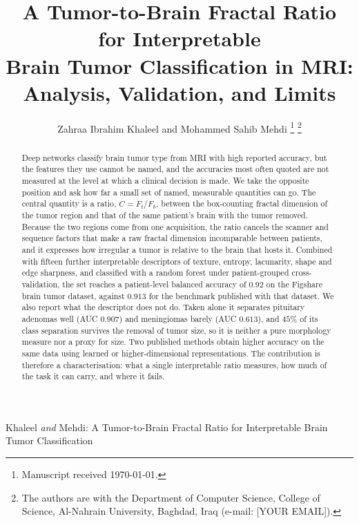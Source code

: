 \documentclass[journal]{IEEEtran}
\begin{document}
\title{A Tumor-to-Brain Fractal Ratio for Interpretable\\
Brain Tumor Classification in MRI:\\
Analysis, Validation, and Limits}

\author{Zahraa Ibrahim Khaleel and Mohammed Sahib Mehdi%
\thanks{Manuscript received \today.}
\thanks{The authors are with the Department of Computer Science, College of Science, Al-Nahrain University, Baghdad, Iraq (e-mail: [YOUR EMAIL]).}}

%
{Khaleel \MakeLowercase{\textit{and}} Mehdi: A Tumor-to-Brain Fractal Ratio for Interpretable Brain Tumor Classification}

\maketitle

\begin{abstract}
Deep networks classify brain tumor type from MRI with high reported accuracy,
but the features they use cannot be named, and the accuracies most often quoted
are not measured at the level at which a clinical decision is made. We take the
opposite position and ask how far a small set of named, measurable quantities can
go. The central quantity is a ratio, $C = F_t/F_b$, between the box-counting
fractal dimension of the tumor region and that of the same patient's brain with
the tumor removed. Because the two regions come from one acquisition, the ratio
cancels the scanner and sequence factors that make a raw fractal dimension
incomparable between patients, and it expresses how irregular a tumor is relative
to the brain that hosts it. Combined with fifteen further interpretable
descriptors of texture, entropy, lacunarity, shape and edge sharpness, and
classified with a random forest under patient-grouped cross-validation, the set
reaches a patient-level balanced accuracy of $0.92$ on the Figshare brain tumor
dataset, against $0.913$ for the benchmark published with that dataset. We also
report what the descriptor does not do. Taken alone it separates pituitary
adenomas well (AUC $0.907$) and meningiomas barely (AUC $0.613$), and $45\%$ of
its class separation survives the removal of tumor size, so it is neither a pure
morphology measure nor a proxy for size. Two published methods obtain higher
accuracy on the same data using learned or higher-dimensional representations.
The contribution is therefore a characterisation: what a single interpretable
ratio measures, how much of the task it can carry, and where it fails.
\end{abstract}
\end{document}
